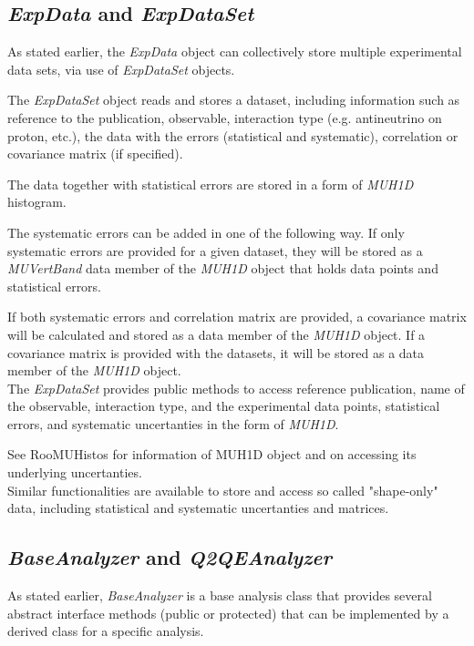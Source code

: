 \subsection{ {\it ExpData} and {\it ExpDataSet} }

As stated earlier, the {\it ExpData} object can collectively store multiple experimental data sets,
via use of {\it ExpDataSet} objects.
 
The {\it ExpDataSet} object reads and stores a dataset, including information such 
as reference to the publication, observable, interaction type (e.g. antineutrino on proton, etc.), 
the data with the errors (statistical and systematic), correlation or covariance matrix (if specified). 

The data together with statistical errors are stored in a form of {\it MUH1D }histogram.

The systematic errors can be added in one of the following way. If only systematic errors are provided for 
a given dataset, they will be stored as a {\it MUVertBand} data member of the {\it MUH1D } object that holds 
data points and statistical errors. 

If both systematic errors and correlation matrix are provided, a covariance 
matrix will be calculated and stored as a data member of the {\it MUH1D } object. If a covariance matrix is 
provided with the datasets, it will be stored as a data member of the {\it MUH1D} object. \\

The {\it ExpDataSet} provides public methods to access reference publication, name of the observable, interaction
type, and the experimental data points, statistical errors, and systematic uncertanties in the form of { \it MUH1D}.

See RooMUHistos\cite{roomuhistos} for information of MUH1D object and on accessing its underlying uncertanties.\\
Similar functionalities are available to store and access so called "shape-only" data, including statistical and
systematic uncertanties and matrices. 

\subsection{ {\it BaseAnalyzer} and {\it Q2QEAnalyzer} }

As stated earlier, {\it BaseAnalyzer} is a base analysis class that provides several abstract interface methods 
(public or protected) that can be implemented by a derived class for a specific analysis. 


